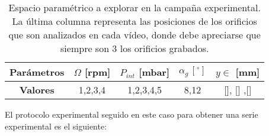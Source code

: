 \begin{table}
\centering
\begin{tabular}{c || c c c c}
\textbf{Parámetros} & $\Omega$ [rpm] & $P_{int}$ [mbar] & $\alpha_{g}\,[^{\circ}]$ & $y \in $ [mm] \\
\hline \hline
\textbf{Valores} & 1,2,3,4 & 1,2,3,4,5 & 8,12 & [], [] ,[] \\
\hline
\end{tabular}
\caption{Espacio paramétrico a explorar en la campaña experimental. La última columna representa las posiciones de los orificios que son analizados en cada vídeo, donde debe apreciarse que siempre son 3 los orificios grabados. }
\end{table}

El protocolo experimental seguido en este caso para obtener una serie experimental es el siguiente:


